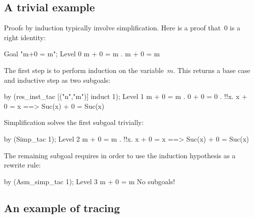 \subsection{A trivial example}
Proofs by induction typically involve simplification.  Here is a proof
that~0 is a right identity:
\begin{ttbox}
Goal "m+0 = m";
{\out Level 0}
{\out m + 0 = m}
{. m + 0 = m}
\end{ttbox}
The first step is to perform induction on the variable~$m$.  This returns a
base case and inductive step as two subgoals:
\begin{ttbox}
by (res_inst_tac [("n","m")] induct 1);
{\out Level 1}
{\out m + 0 = m}
{. 0 + 0 = 0}
{. !!x. x + 0 = x ==> Suc(x) + 0 = Suc(x)}
\end{ttbox}
Simplification solves the first subgoal trivially:
\begin{ttbox}
by (Simp_tac 1);
{\out Level 2}
{\out m + 0 = m}
{. !!x. x + 0 = x ==> Suc(x) + 0 = Suc(x)}
\end{ttbox}
The remaining subgoal requires  in order to use the
induction hypothesis as a rewrite rule:
\begin{ttbox}
by (Asm_simp_tac 1);
{\out Level 3}
{\out m + 0 = m}
{\out No subgoals!}
\end{ttbox}

\subsection{An example of tracing}

